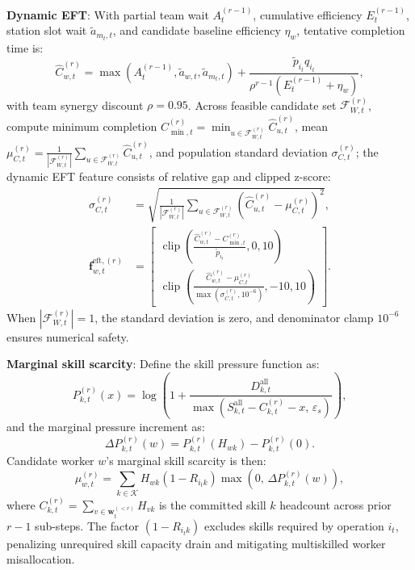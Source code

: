 \documentclass[journal,10pt]{IEEEtran}
\begin{document}
\textbf{Dynamic EFT}:
With partial team wait $A_t^{(r-1)}$, cumulative efficiency $E_t^{(r-1)}$, station slot wait $\widetilde a_{m_t,t}$, and candidate baseline efficiency $\eta_w$, tentative completion time is:
\begin{equation}
\widehat C_{w,t}^{(r)} = \max\!\left(A_t^{(r-1)}, \widetilde a_{w,t}, \widetilde a_{m_t,t}\right) + \frac{\widetilde p_{i_t}q_{i_t}}{\rho^{r-1}(E_t^{(r-1)}+\eta_w)},
\end{equation}
with team synergy discount $\rho=0.95$. Across feasible candidate set $\mathcal F_{W,t}^{(r)}$, compute minimum completion $C_{\min,t}^{(r)}=\min_{u\in\mathcal F_{W,t}^{(r)}}\widehat C_{u,t}^{(r)}$, mean $\mu_{C,t}^{(r)}=\frac{1}{|\mathcal F_{W,t}^{(r)}|}\sum_{u\in\mathcal F_{W,t}^{(r)}}\widehat C_{u,t}^{(r)}$, and population standard deviation $\sigma_{C,t}^{(r)}$; the dynamic EFT feature consists of relative gap and clipped z-score:
\begin{align}
\sigma_{C,t}^{(r)} &= \sqrt{\frac{1}{|\mathcal F_{W,t}^{(r)}|} \sum_{u\in\mathcal F_{W,t}^{(r)}} \left(\widehat C_{u,t}^{(r)}-\mu_{C,t}^{(r)}\right)^2}, \\
\mathbf f_{w,t}^{\mathrm{eft},(r)} &= \begin{bmatrix}
\operatorname{clip}\left(\frac{\widehat C_{w,t}^{(r)}-C_{\min,t}^{(r)}}{\widetilde p_{i_t}}, 0, 10\right) \\
\operatorname{clip}\left(\frac{\widehat C_{w,t}^{(r)}-\mu_{C,t}^{(r)}}{\max(\sigma_{C,t}^{(r)}, 10^{-6})}, -10, 10\right)
\end{bmatrix}.
\end{align}
When $|\mathcal F_{W,t}^{(r)}|=1$, the standard deviation is zero, and denominator clamp $10^{-6}$ ensures numerical safety.

\textbf{Marginal skill scarcity}:
Define the skill pressure function as:
\begin{equation}
P_{k,t}^{(r)}(x) = \log\!\left( 1+ \frac{D_{k,t}^{\mathrm{all}}} {\max\!\left( S_{k,t}^{\mathrm{all}}-C_{k,t}^{(r)}-x,\, \varepsilon_s \right)} \right),
\end{equation}
and the marginal pressure increment as:
\begin{equation}
\Delta P_{k,t}^{(r)}(w) = P_{k,t}^{(r)}(H_{wk}) - P_{k,t}^{(r)}(0).
\end{equation}
Candidate worker $w$'s marginal skill scarcity is then:
\begin{equation}
\mu_{w,t}^{(r)} = \sum_{k\in\mathcal K} H_{wk}(1-R_{i_tk}) \max\!\left( 0,\, \Delta P_{k,t}^{(r)}(w) \right),
\end{equation}
where $C_{k,t}^{(r)} = \sum_{v\in\mathbf w_t^{(<r)}} H_{vk}$ is the committed skill $k$ headcount across prior $r-1$ sub-steps. The factor $(1-R_{i_tk})$ excludes skills required by operation $i_t$, penalizing unrequired skill capacity drain and mitigating multiskilled worker misallocation.
\end{document}
